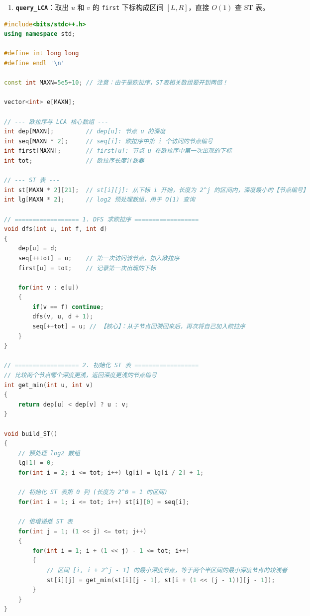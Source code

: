 \documentclass[10pt,landscape,a4paper]{article}
\begin{document}
\begin{multicols*}{3}
\begin{enumerate}[start=1]
\item \textbf{\texttt{q\allowbreak{}u\allowbreak{}e\allowbreak{}r\allowbreak{}y\allowbreak{}\_\allowbreak{}L\allowbreak{}C\allowbreak{}A}}：取出 $u$ 和 $v$ 的 \texttt{f\allowbreak{}i\allowbreak{}r\allowbreak{}s\allowbreak{}t} 下标构成区间 $[L, R]$，直接 $O(1)$ 查 ST 表。
\end{enumerate}
\par{}\par
\begin{lstlisting}[language=C++]
#include<bits/stdc++.h>
using namespace std;

#define int long long
#define endl '\n'

const int MAXN=5e5+10; // 注意：由于是欧拉序，ST表相关数组要开到两倍！

vector<int> e[MAXN];

// --- 欧拉序与 LCA 核心数组 ---
int dep[MAXN];         // dep[u]: 节点 u 的深度
int seq[MAXN * 2];     // seq[i]: 欧拉序中第 i 个访问的节点编号
int first[MAXN];       // first[u]: 节点 u 在欧拉序中第一次出现的下标
int tot;               // 欧拉序长度计数器

// --- ST 表 ---
int st[MAXN * 2][21];  // st[i][j]: 从下标 i 开始，长度为 2^j 的区间内，深度最小的【节点编号】
int lg[MAXN * 2];      // log2 预处理数组，用于 O(1) 查询

// ================== 1. DFS 求欧拉序 ==================
void dfs(int u, int f, int d)
{
    dep[u] = d;
    seq[++tot] = u;    // 第一次访问该节点，加入欧拉序
    first[u] = tot;    // 记录第一次出现的下标
    
    for(int v : e[u])
    {
        if(v == f) continue;
        dfs(v, u, d + 1);
        seq[++tot] = u; // 【核心】：从子节点回溯回来后，再次将自己加入欧拉序
    }
}

// ================== 2. 初始化 ST 表 ==================
// 比较两个节点哪个深度更浅，返回深度更浅的节点编号
int get_min(int u, int v) 
{
    return dep[u] < dep[v] ? u : v;
}

void build_ST()
{
    // 预处理 log2 数组
    lg[1] = 0;
    for(int i = 2; i <= tot; i++) lg[i] = lg[i / 2] + 1;
    
    // 初始化 ST 表第 0 列 (长度为 2^0 = 1 的区间)
    for(int i = 1; i <= tot; i++) st[i][0] = seq[i];
    
    // 倍增递推 ST 表
    for(int j = 1; (1 << j) <= tot; j++)
    {
        for(int i = 1; i + (1 << j) - 1 <= tot; i++)
        {
            // 区间 [i, i + 2^j - 1] 的最小深度节点，等于两个半区间的最小深度节点的较浅者
            st[i][j] = get_min(st[i][j - 1], st[i + (1 << (j - 1))][j - 1]);
        }
    }
}


\end{lstlisting}
\end{multicols*}
\end{document}
